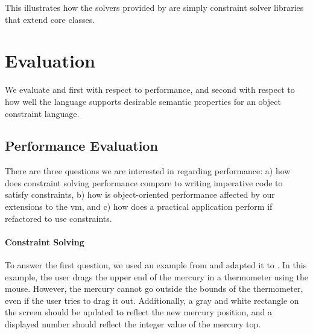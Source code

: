 This illustrates how the solvers provided by \toolname are simply
constraint solver libraries that extend core classes.

% 


\section{Evaluation}
\label{sec:evaluation}
We evaluate \langname and \toolname first with respect to performance,
and second with respect to how well the language supports desirable
semantic properties for an object constraint language.

\subsection{Performance Evaluation}
\label{sec:performance-evaluation}

There are three questions we are interested in regarding performance:
a) how does constraint solving performance compare to writing
imperative code to satisfy constraints, b) how is object-oriented
performance affected by our extensions to the \ac{vm}, and c)
how does a practical application perform if refactored to use
constraints.

\paragraph{Constraint Solving}
To answer the first question, we used an example from
\cite{lopez-asi-1994} and adapted it to \toolname. In this example,
the user drags the upper end of the mercury in a thermometer using the
mouse. However, the mercury cannot go outside the bounds of the
thermometer, even if the user tries to drag it out. Additionally, a
gray and white rectangle on the screen should be updated to reflect
the new mercury position, and a displayed number should reflect the
integer value of the mercury top.

